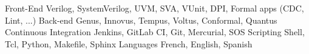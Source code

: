

\begin{cvskills}

  \cvskill
    {Front-End} %
    {Verilog, SystemVerilog, UVM, SVA, VUnit, DPI, Formal apps (CDC, Lint, ...)} %
  \cvskill
    {Back-end} %
    {Genus, Innovus, Tempus, Voltus, Conformal, Quantus} %
  \cvskill
    {Continuous Integration} %
    {Jenkins, GitLab CI, Git, Mercurial, SOS} %
  \cvskill
    {Scripting} %
    {Shell, Tcl, Python, Makefile, Sphinx} %
  \cvskill
    {Languages} %
    {French, English, Spanish} %

\end{cvskills}
